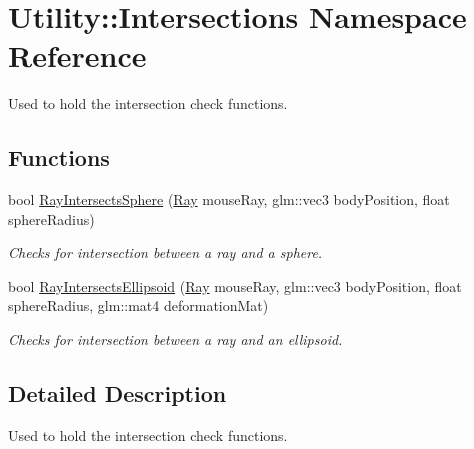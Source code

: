\hypertarget{namespace_utility_1_1_intersections}{\section{Utility\-:\-:Intersections Namespace Reference}
\label{namespace_utility_1_1_intersections}
}


Used to hold the intersection check functions.  


\subsection*{Functions}
\begin{DoxyCompactItemize}
\item 
bool \hyperlink{namespace_utility_1_1_intersections_a0235bddb016fe1b1fefd9c2eb004ef0d}{Ray\-Intersects\-Sphere} (\hyperlink{class_utility_1_1_ray}{Ray} mouse\-Ray, glm\-::vec3 body\-Position, float sphere\-Radius)
\begin{DoxyCompactList}\small\item\em Checks for intersection between a ray and a sphere. \end{DoxyCompactList}\item 
bool \hyperlink{namespace_utility_1_1_intersections_a96db5faaa3683901a7f1be805423e618}{Ray\-Intersects\-Ellipsoid} (\hyperlink{class_utility_1_1_ray}{Ray} mouse\-Ray, glm\-::vec3 body\-Position, float sphere\-Radius, glm\-::mat4 deformation\-Mat)
\begin{DoxyCompactList}\small\item\em Checks for intersection between a ray and an ellipsoid. \end{DoxyCompactList}\end{DoxyCompactItemize}


\subsection{Detailed Description}
Used to hold the intersection check functions. 

